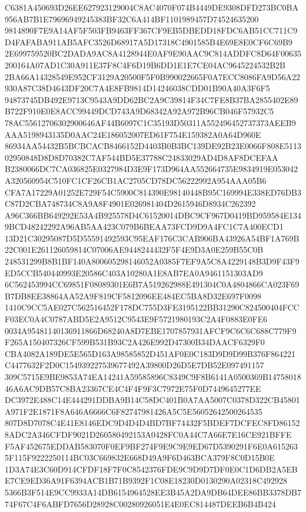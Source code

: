 \documentclass[UTF8,fontset=fandol,zihao=-4,a4paper]{ctexart}
\begin{document}
{{C6381A450693D26EE627923129004C8AC4070F074B4449DE9308DFD273BC0BA956AB7B1E79696949245383BF32C6A414BF1101989457D74524635200
9814890F7E9A14AF5F503FB9463FF367CF9EB5DBEDD18FDC6AB51CC711C9D4FAFABA911AB5AFC3526D68917A5D17318C4901585B4E69E8E0CF6C69B9
2E699759520BC2DADA9AC8A4128944E0AF9E90AAC9C814ADDFC8D64F00635200164A07AD1C30A911E37F8C4F6D19B6DD1E1E7CE04AC9645224532B2B
2BA66A14328549E952CF3129A20500F5F0B990022665F0A7ECC8086FA9D56A22930A87C38D4643DF20C7A4E8FB9814D14246038CDD01B90A40A3F6F5
94873745DB492E9713C9543A9DD62BC2A9C39814F34C7FE8B37BA2855402E89B722F910E0E8ACC99449DCD743A9D68342A92A972B96CB046F57932C5
78AC55612706302900646AF44B6097C1C35193D50311A552496452737373AEEB9AAA5198943135D0AAC24E186052007ED61F754E159382A0A64D960E
86934AA54432B5BCBCACB8466152D4403B0B3BC139DE92B23E0066F808E511302950848D8D8D70382C7AF544BD5E37788C24833029AD4D8AF8DCEFAA
B2380066DC7CA036825E0327984D3E9F173D964AA552664735E9834919E053042A320560954C510FC1CF26CB1AC2705CD78DC56222992A954AAA05B6
CFA7A17229A01252E729F54C5900C814390E98140448B95C169994E338ED76DB3C87D2CBA748734C8A9A8F4901E026981404D2615946D8934C262392
A96C366BB649292E53A4B925578D4C61520014DBC9CF967D0419BD959584E1349BCD48242292A96AB5AA423C079B6BEAA73FCD9D9A4FC1C7A400ECD1
13D21C30295087D5D55591492593C95EAF176C3CAB906BA43926A54BF1A769B22C001E261126059814C07006AE9448244432F5F4E9D3A0E259B55C0B
248531299B8B1BF140A800605298146052A0385F7EF9A5C8A4229148B3D9F43F9ED5CCB540440993E20586C403A10280A1E8AB7EA0A9461151303AD9
6C562453994CC69851F08089301E6B7A519262988E491304C0A4804866CA023F69B7DB8EE38864AA52A9F819CF5812096EE484EC5BA8D32E697F0098
1410C9CC5AE027C562516452F178DC755D3FE3195122BB31290C824500404FCCF03EC0A4C0787ABD5E2A9512C9543E9F5721980193C2A4F0883E0FE6
0034A95481140136911866D68240A8D7EBE1707857931AFCF9C6C6C688C779F9F265A150407326CF599B531B93C2A426E992D47300B34DAACF6329F0
CBA4082A189DE5E565D163A98585852D451AF0E0C183D9D9D99B376F864221C4477632F2D0C154939227539677492A39800D26D5E7DB52E097491157
309C5715E9BE9853A74EA14241A59585896C8349C9F8B6141A0500369B1475801846A6AC9DB57C8BA23367CE4C4F4F9F3C7972E75F0D7449645277EE
DC3972E488C14E444291DDBA9B14C58DC401B0A7AA5007C0378D322CB45801A971F2E1871F8A646A6666C6F82747981426A5C5E56052642500264535
807D8D7078C4E41E8146EDC9D4D4D4BD7BF74432F5BDEF7DCFEC8FD861528ADC2A346CFDF9021D260580492153A0428FC0A44C7A66E7E16CE921BFFE
F5AF452675EDDAB583070F0EF9BF274F9E9C9E9ED67D5390291F6E0A6152635F115F9222250114BC03C669832E668D49A9F6D463BCA379F8C0D15B0E
1D3A74E3C60D914CFDF18F7F0C8542376FDE9C9D9D7DF0E0C1D6DB2A5EBE7CE9ED36A91F6394ACB1B71B9392F1C08E18230D0130290A02318C492928
5366B3F514E9CC9933A14DB6154964528EE3B45A2DA9DB64DEE86BB3378DB774F67C4F6ABFD7656D28928C00280926051E4E0EC814487DEEB6B4B424
}}
\end{document}
